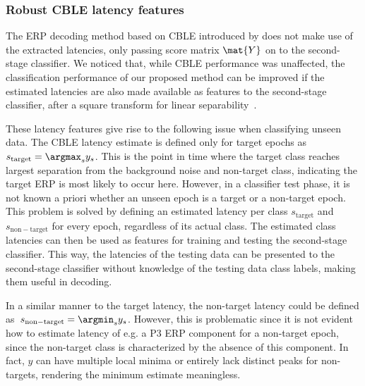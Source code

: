 \subsubsection{Robust CBLE latency features}
\label{sec:robust-latency}
The ERP decoding method based on CBLE introduced by \cite{Mowla2017} does
not make use of the extracted latencies, only passing score matrix $\mat{Y}$ on
to the second-stage classifier.
We noticed that, while CBLE performance was unaffected, the classification
performance of our proposed method can be improved if the estimated
latencies are also made available as features to the second-stage classifier,
after a square transform for linear separability~\cite{Thompson2012}.

These latency features give rise to the following issue when
classifying unseen data.
The CBLE latency estimate is defined only for target epochs as
$s_\mathrm{target}=\argmax_s{y_s}$.
This is the point in time where the target class reaches largest separation
from the background noise and non-target class, indicating the target ERP is
most likely to occur here.
However, in a classifier test phase, it is not known a priori whether an
unseen epoch is a target or a non-target epoch.
This problem is solved by defining an estimated latency per class
$s_\mathrm{target}$ and $s_\mathrm{non-target}$ for every epoch,
regardless of its actual class.
The estimated class latencies can then be used as features  for training and
testing the second-stage classifier.
This way, the latencies of the testing data can be presented to the second-stage
classifier without knowledge of the testing data class labels, making them
useful in decoding.

In a similar manner to the target latency, the non-target latency could be defined
as~$s_\mathrm{non-target}=\argmin_s{y_s}$.
However, this is problematic since it is not evident how to estimate
latency of e.g. a P3 ERP component for a non-target epoch, since the
non-target class is characterized by the absence of this component.
In fact, $y$ can have multiple local minima or entirely lack distinct peaks for
non-targets, rendering the minimum estimate meaningless.

